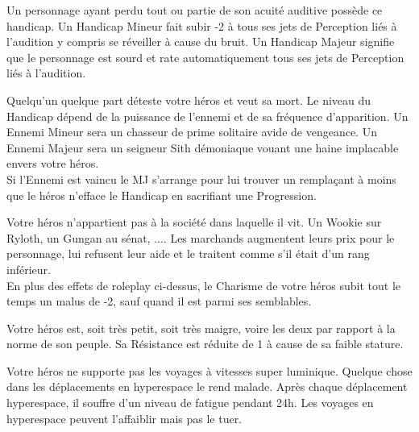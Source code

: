 \begin{description}[align=left]
    \item [Dur d’Oreille (Mineur ou Majeur)]
        Un personnage ayant perdu tout ou partie de son acuité auditive possède ce handicap. Un Handicap Mineur fait subir -2 à tous ses jets de Perception liés à l'audition y compris se réveiller à cause du bruit. Un Handicap Majeur signifie que le personnage est sourd et rate automatiquement tous ses jets de Perception liés à l'audition.

    \item [Ennemi (Mineur ou Majeur)]
        Quelqu'un quelque part déteste votre héros et veut sa mort. Le niveau du Handicap dépend de la puissance de l'ennemi et de sa fréquence d'apparition. Un Ennemi Mineur sera un chasseur de prime solitaire avide de vengeance. Un Ennemi Majeur sera un seigneur Sith démoniaque vouant une haine implacable envers votre héros.\\
        Si l'Ennemi est vaincu le MJ s'arrange pour lui trouver un remplaçant à moins que le héros n'efface le Handicap en sacrifiant une Progression.

    \item [Étranger (Mineur)]
        Votre héros n'appartient pas à la société dans laquelle il vit. Un Wookie sur Ryloth, un Gungan au sénat, .... Les marchands augmentent leurs prix pour le personnage, lui refusent leur aide et le traitent comme s'il était d'un rang inférieur. \\
        En plus des effets de roleplay ci-dessus, le Charisme de votre héros subit tout le temps un malus de -2, sauf quand il est parmi ses semblables.

    \item [Frêle (Majeur)]
        Votre héros est, soit très petit, soit très maigre, voire les deux par rapport à la norme de son peuple. Sa Résistance est réduite de 1 à cause de sa faible stature.

    \item [Mal de l'espace (Mineur)]
        Votre héros ne supporte pas les voyages à vitesses super luminique. Quelque chose dans les déplacements en hyperespace le rend malade. Après chaque déplacement hyperespace, il souffre d'un niveau de fatigue pendant 24h. Les voyages en hyperespace peuvent l'affaiblir mais pas le tuer.


\end{description}
